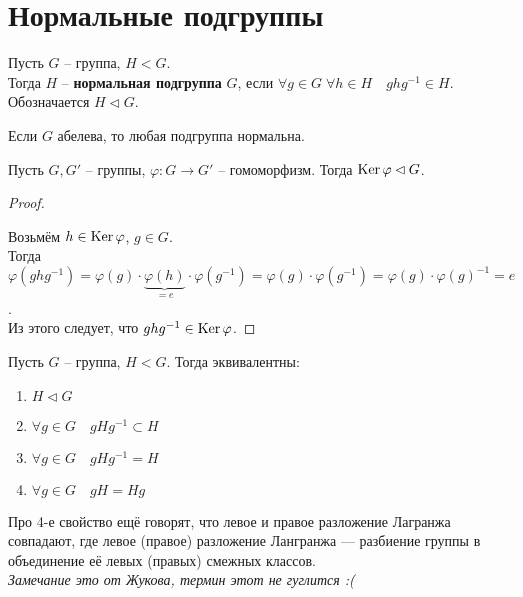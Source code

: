 \section{Нормальные подгруппы}
\begin{conj}
    Пусть $G$ -- группа, $H < G$. \\Тогда $H$ --
    \textbf{нормальная подгруппа} $G$, если
    $\forall g \in G \; \forall h \in H \quad
    ghg^{-1} \in H$. \\
    Обозначается $H \lhd G$.
\end{conj}

\notice Если $G$ абелева, то любая подгруппа нормальна.

\begin{theorem-non}
    Пусть $G, G'$ -- группы, $\varphi \colon G \to G'$ -- гомоморфизм.
    Тогда $\operatorname{Ker} \varphi \lhd G$.
\end{theorem-non}
\begin{proof} $ $

    Возьмём $h \in \operatorname{Ker} \varphi$, $g \in G$.\\
    Тогда $\varphi(ghg^{-1}) = \varphi(g) \cdot 
    \underbrace{\varphi(h)}_{= e}
    \cdot \varphi(g^{-1}) =
    \varphi(g) \cdot \varphi(g^{-1}) =
    \varphi(g) \cdot \varphi(g)^{-1} = e$. \\
    Из этого следует, что $ghg^{-1} \in \operatorname{Ker} \varphi$.
\end{proof}

\begin{theorem-non}
    Пусть $G$ -- группа, $H < G$. Тогда эквивалентны:
    \begin{enumerate}
        \item $H \lhd G$
        \item $\forall g \in G \quad gHg^{-1} \subset H$
        \item $\forall g \in G \quad gHg^{-1} = H$
        \item $\forall g \in G \quad gH = Hg$
    \end{enumerate}
\end{theorem-non}
\notice Про 4-е свойство ещё говорят, что левое и правое
разложение Лагранжа совпадают, где левое (правое) разложение Лангранжа
--- разбиение группы в объединение её левых (правых) смежных классов.\\
\textit{Замечание это от Жукова, термин этот не гуглится :(}

